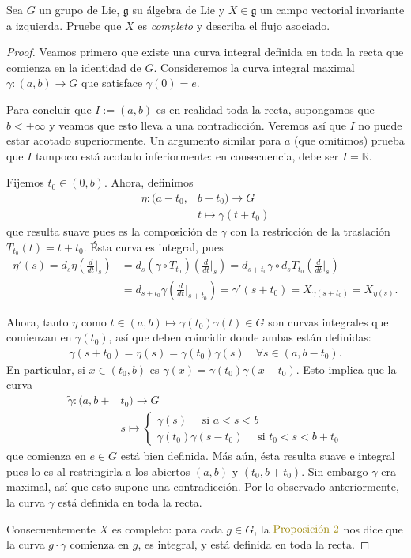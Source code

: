 \documentclass[11pt]{article}
\newcommand{\R}{\mathbb{R}}
\newcommand{\paint}[1]{\color{color}{#1}}
\newenvironment{exercise}[2][Ejercicio]{\begin{trivlist}
\item[\hskip \labelsep \paint{{\bfseries #1}}\hskip \labelsep {\bfseries #2.}]}{\end{trivlist}}
\begin{document}
\begin{exercise}{8} Sea $G$ un grupo de Lie, $\mathfrak{g}$ su álgebra de Lie y $X\in\mathfrak{g}$ un campo vectorial invariante a izquierda. Pruebe que $X$ es \emph{completo} y describa el flujo asociado.
\end{exercise}
\begin{proof} Veamos primero que existe una curva integral definida en toda la recta que comienza en la identidad de $G$. Consideremos la curva integral maximal $\gamma : (a,b) \to G$ que satisface $\gamma(0) = e$. 

Para concluir que $I := (a,b)$ es en realidad toda la recta, supongamos que $b < +\infty$ y veamos que esto lleva a una contradicción. Veremos así que $I$ no puede estar acotado superiormente. Un argumento similar para $a$ (que omitimos) prueba que $I$ tampoco está acotado inferiormente: en consecuencia, debe ser $I = \R$.

Fijemos $t_0 \in (0,b)$. Ahora, definimos
\begin{align*}
\eta  : (a-t_0,&b-t_0) \to G\\
&t \longmapsto \gamma(t+t_0)
\end{align*}
que resulta suave pues es la composición de $\gamma$ con la restricción de la traslación $T_{t_0}(t) = t + t_0$. Ésta curva es integral, pues
\begin{align*}
\eta'(s) = d_s\eta\left(\frac{d}{dt}\Big|_{s}\right) &= d_s(\gamma \circ T_{t_0})\left(\frac{d}{dt}\Big|_{s}\right) = d_{s+t_0}\gamma \circ d_{s}T_{t_0}\left(\frac{d}{dt}\Big|_s\right)\\
&= d_{s+t_0}\gamma\left(\frac{d}{dt}\Big|_{s+t_0}\right) = \gamma'(s+t_0) = X_{\gamma(s+t_0)} = X_{\eta(s)}.
\end{align*}


Ahora, tanto $\eta$ como $t \in (a,b) \mapsto \gamma(t_0)\gamma(t) \in G$ son curvas integrales que comienzan en $\gamma(t_0)$, así que deben coincidir donde ambas están definidas:
\begin{align*}
\gamma(s+t_0) = \eta(s) = \gamma(t_0)\gamma(s) \quad \forall s \in (a,b-t_0).
\end{align*}
En particular, si $x \in (t_0,b)$ es $\gamma(x) = \gamma(t_0)\gamma(x-t_0)$. Esto implica que la curva
\begin{align*}
\tilde{\gamma} : (a,b+&t_0) \to G\\
&s \longmapsto \begin{cases}
\gamma(s) \quad \text{ si $a < s < b$}\\
\gamma(t_0)\gamma(s-t_0) \quad \text{ si $t_0 < s < b + t_0$}
\end{cases}
\end{align*}
que comienza en $e \in G$ est\'a bien definida. M\'as a\'un, ésta resulta suave e integral pues lo es al restringirla a los abiertos $(a,b)$ y $(t_0,b+t_0)$. Sin embargo $\gamma$ era maximal, así que esto supone una contradicción. Por lo observado anteriormente, la curva $\gamma$ está definida en toda la recta.

Consecuentemente $X$ es completo: para cada $g \in G$, la $\paint{\text{Proposición $2$}}$ nos dice que la curva $g\cdot\gamma$ comienza en $g$, es integral, y está definida en toda la recta.
\end{proof}
\end{document}
